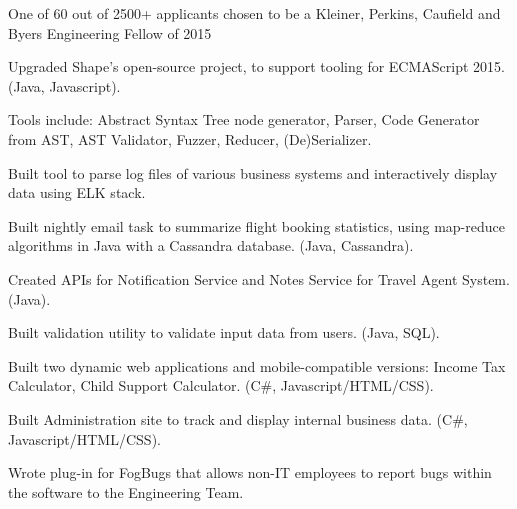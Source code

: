 \documentclass[letterpaper]{deedy-resume} %
\begin{document}
\begin{minipage}[t]{0.7\textwidth}
\sectionspace %



\begin{tightitemize}
\item One of 60 out of 2500+ applicants chosen to be a Kleiner, Perkins, Caufield and Byers Engineering Fellow of 2015
\item Upgraded Shape's open-source project, to support tooling for ECMAScript 2015. (Java, Javascript).
\item Tools include: Abstract Syntax Tree node generator, Parser, Code Generator from AST, AST Validator, Fuzzer, Reducer, (De)Serializer.
\end{tightitemize}

\sectionspace %



\begin{tightitemize}
\item Built tool to parse log files of various business systems and interactively display data using ELK stack.
\item Built nightly email task to summarize flight booking statistics, using map-reduce algorithms in Java with a Cassandra database. (Java, Cassandra).
\item Created APIs for Notification Service and Notes Service for Travel Agent System. (Java).
\item Built validation utility to validate input data from users. (Java, SQL).
\end{tightitemize}

\sectionspace %



\begin{tightitemize}
\item Built two dynamic web applications and mobile-compatible versions: Income Tax Calculator, Child Support Calculator. (C\#, Javascript/HTML/CSS).
\item Built Administration site to track and display internal business data. (C\#, Javascript/HTML/CSS).
\item Wrote plug-in for FogBugs that allows non-IT employees to report bugs within the software to the Engineering Team.
\end{tightitemize}


\end{minipage}
\end{document}

